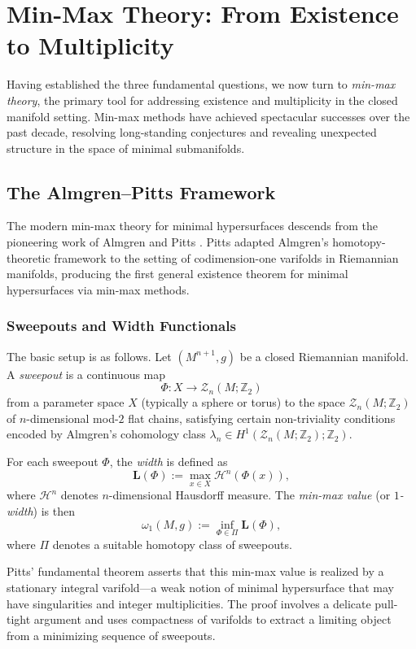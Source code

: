 \section{Min-Max Theory: From Existence to Multiplicity}\label{sec:minmax}

Having established the three fundamental questions, we now turn to \emph{min-max theory}, the
primary tool for addressing existence and multiplicity in the closed manifold setting. Min-max
methods have achieved spectacular successes over the past decade, resolving long-standing
conjectures and revealing unexpected structure in the space of minimal submanifolds.

\subsection{The Almgren--Pitts Framework}

The modern min-max theory for minimal hypersurfaces descends from the pioneering work of Almgren
\cite{Alm62,Alm65,Alm68} and Pitts \cite{Pit81}. Pitts adapted Almgren's homotopy-theoretic
framework to the setting of codimension-one varifolds in Riemannian manifolds, producing the first
general existence theorem for minimal hypersurfaces via min-max methods.

\subsubsection{Sweepouts and Width Functionals}

The basic setup is as follows. Let $(M^{n+1}, g)$ be a closed Riemannian manifold. A
\emph{sweepout} is a continuous map
\[
    \Phi: X \to \mathcal{Z}_n(M; \mathbb{Z}_2)
\]
from a parameter space $X$ (typically a sphere or torus) to the space $\mathcal{Z}_n(M;\mathbb{Z}_2)$
of $n$-dimensional mod-$2$ flat chains, satisfying certain non-triviality conditions encoded by
Almgren's cohomology class $\lambda_n \in H^1(\mathcal{Z}_n(M;\mathbb{Z}_2); \mathbb{Z}_2)$.

For each sweepout $\Phi$, the \emph{width} is defined as
\[
    \mathbf{L}(\Phi) := \max_{x \in X} \mathcal{H}^n(\Phi(x)),
\]
where $\mathcal{H}^n$ denotes $n$-dimensional Hausdorff measure. The \emph{min-max value} (or
\emph{$1$-width}) is then
\[
    \omega_1(M,g) := \inf_{\Phi \in \Pi} \mathbf{L}(\Phi),
\]
where $\Pi$ denotes a suitable homotopy class of sweepouts.

Pitts' fundamental theorem asserts that this min-max value is realized by a stationary integral
varifold---a weak notion of minimal hypersurface that may have singularities and integer
multiplicities. The proof involves a delicate pull-tight argument and uses compactness of varifolds
to extract a limiting object from a minimizing sequence of sweepouts.

